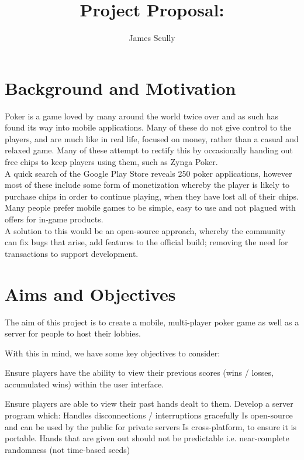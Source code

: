 \documentclass[11pt]{article}
\title{Project Proposal: \pt}
\author{James Scully}
\begin{document}
\maketitle

\section*{Background and Motivation}

Poker is a game loved by many around the world twice over and as such has found its way into mobile applications. Many of these do not give control to the players, and are much like in real life, focused on money, rather than a casual and relaxed game. Many of these attempt to rectify this by occasionally handing out free chips to keep players using them, such as Zynga Poker. \\

A quick search of the Google Play Store reveals 250 poker applications, however most of these include some form of monetization whereby the player is likely to purchase chips in order to continue playing, when they have lost all of their chips. Many people prefer mobile games to be simple, easy to use and not plagued with offers for in-game products.  \\

A solution to this would be an open-source approach, whereby the community can fix bugs that arise, add features to the official build; removing the need for transactions to support development. 




\newpage
\section*{Aims and Objectives}

The aim of this project is to create a mobile, multi-player poker game as well as a server for people to host their lobbies. 

With this in mind, we have some key objectives to consider: 

\begin{outline}

	\1 Ensure players have the ability to view their previous scores (wins / losses, accumulated wins) within the user interface.

	\1 Ensure players are able to view their past hands dealt to them. 
	\1 Develop a server program which: 
		\2 Handles disconnections / interruptions gracefully
		\2 Is open-source and can be used by the public for private servers
		\2 Is cross-platform, to ensure it is portable.
	\1 Hands that are given out should not be predictable i.e. near-complete randomness (not time-based seeds)


	
\end{outline}
\end{document}
